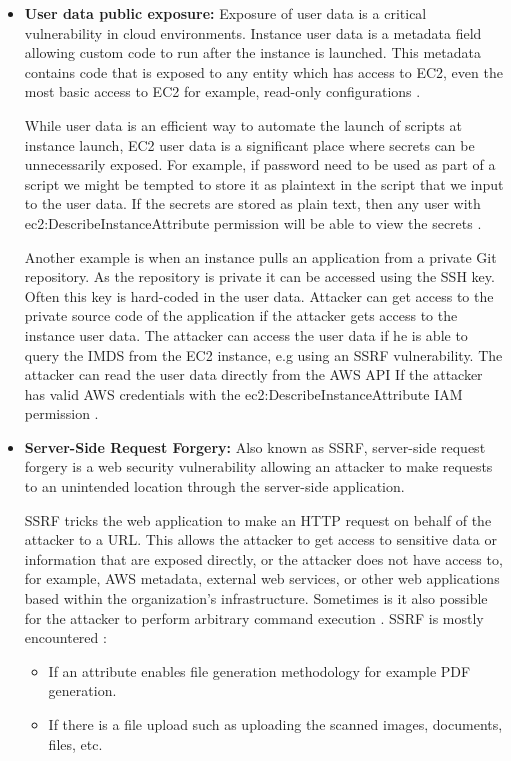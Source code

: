 \begin{itemize}
    \item \textbf{User data public exposure:} Exposure of user data is a critical vulnerability in cloud environments.
    Instance user data is a metadata field allowing custom code to run after the instance is launched.
    This metadata
    contains code that is exposed to any entity which has access to EC2, even the most basic access to EC2 for
    example, read-only configurations \cite{49}.

    While user data is an efficient way to automate the launch of scripts at instance launch, EC2 user data is a
    significant place where secrets can be unnecessarily exposed.
    For example, if password need to be used as part of
    a script we might be tempted to store it as plaintext in the script that we input to the user data.
    If the secrets are stored as plain text, then any user with ec2:DescribeInstanceAttribute permission will be able to view the secrets \cite{50}.

    Another example is when an instance pulls an application from a private Git repository.
    As the repository is
    private it can be accessed using the SSH key.
    Often this key is hard-coded in the user data.
    Attacker can get
    access to the private source code of the application if the attacker gets access to the instance user data.
    The attacker can access the user data if he is able to query the IMDS from the EC2 instance, e.g using an SSRF
    vulnerability.
    The attacker can read the user data directly from the AWS API If the attacker has valid AWS
    credentials with the ec2:DescribeInstanceAttribute IAM permission \cite{51}.
\end{itemize}

\begin{itemize}
    \item \textbf{Server-Side Request Forgery:} Also known as SSRF, server-side request forgery is a web security
    vulnerability allowing an attacker to make requests to an unintended location through the server-side application.

    SSRF tricks the web application to make an HTTP request on behalf of the attacker to a URL. This allows the
    attacker to get access to sensitive data or information that are exposed directly, or the attacker does not have
    access to, for example, AWS metadata, external web services, or other web applications based within the
    organization’s infrastructure.
    Sometimes is it also possible for the attacker to perform arbitrary command
    execution \cite{52}.
    SSRF is mostly encountered \cite{53}:
    \begin{itemize}
        \item If an attribute enables file generation methodology for example PDF generation.
    \end{itemize}
    \begin{itemize}
        \item If there is a file upload such as uploading the scanned images, documents, files, etc.
    \end{itemize}
\end{itemize}

